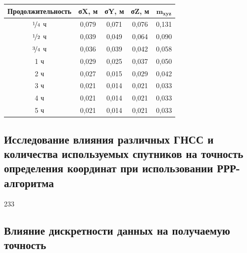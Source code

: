 \begin{table} [htbp]
	\centering\small
	\label{tab:tab15}{%
		\begin{tabular}{|c|c|c|c|c|}
			\hline
			\textbf{Продолжительность} & \textbf{σX, м}   & \textbf{σY, м} & \textbf{σZ, м} & $\mathbf{m_{xyz}}$ \\ \hline
			$\nicefrac{1}{4}$ ч        & 0,079            & 0,071          & 0,076          & 0,131              \\ \hline
			$\nicefrac{1}{2}$ ч        & 0,039            & 0,049          & 0,064          & 0,090              \\ \hline
			$\nicefrac{3}{4}$ ч        & 0,036            & 0,039          & 0,042          & 0,058              \\ \hline
			1 ч                        & 0,029            & 0,025          & 0,037          & 0,050              \\ \hline
			2 ч                        & 0,027            & 0,015          & 0,029          & 0,042              \\ \hline
			3 ч                        & 0,021            & 0,014          & 0,021          & 0,033              \\ \hline
			4 ч	                       & 0,021            & 0,014          & 0,021          & 0,033              \\ \hline
			5 ч                        & 0,021            & 0,014          & 0,021          & 0,033              \\ \hline
		\end{tabular}
	}
\end{table}





\subsection[Влияние используемых ГНСС и количества спутников]{Исследование влияния различных ГНСС и количества используемых спутников на точность определения координат при использовании РРР-алгоритма}\label{subsec:ch2/sec3/sub3}

233



\subsection{Влияние дискретности данных на получаемую точность}\label{subsec:ch2/sec3/sub4}

